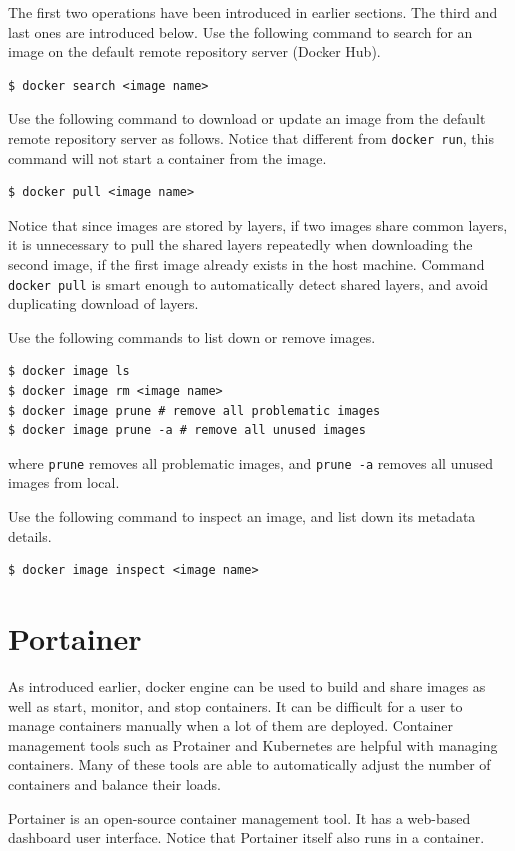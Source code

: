 The first two operations have been introduced in earlier sections. The third and last ones are introduced below. Use the following command to search for an image on the default remote repository server (Docker Hub).
\begin{lstlisting}
$ docker search <image name>
\end{lstlisting}
Use the following command to download or update an image from the default remote repository server as follows. Notice that different from \verb|docker run|, this command will not start a container from the image.
\begin{lstlisting}
$ docker pull <image name>
\end{lstlisting}
Notice that since images are stored by layers, if two images share common layers, it is unnecessary to pull the shared layers repeatedly when downloading the second image, if the first image already exists in the host machine. Command \verb|docker pull| is smart enough to automatically detect shared layers, and avoid duplicating download of layers.

Use the following commands to list down or remove images.
\begin{lstlisting}
$ docker image ls
$ docker image rm <image name>
$ docker image prune # remove all problematic images
$ docker image prune -a # remove all unused images
\end{lstlisting}
where \verb|prune| removes all problematic images, and \verb|prune -a| removes all unused images from local.

Use the following command to inspect an image, and list down its metadata details.
\begin{lstlisting}
$ docker image inspect <image name>
\end{lstlisting}

\section{Portainer}

As introduced earlier, docker engine can be used to build and share images as well as start, monitor, and stop containers. It can be difficult for a user to manage containers manually when a lot of them are deployed. Container management tools such as Protainer and Kubernetes are helpful with managing containers. Many of these tools are able to automatically adjust the number of containers and balance their loads.

Portainer is an open-source container management tool. It has a web-based dashboard user interface. Notice that Portainer itself also runs in a container.

